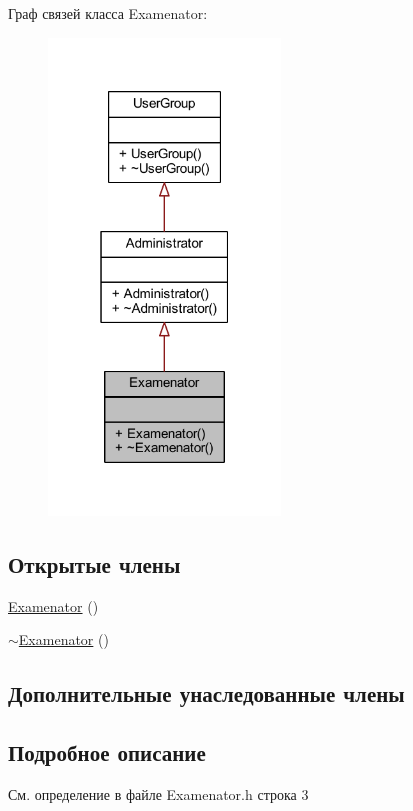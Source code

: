Граф связей класса Examenator\+:\nopagebreak
\begin{figure}[H]
\begin{center}
\leavevmode
\includegraphics[width=175pt]{dd/d27/class_examenator__coll__graph}
\end{center}
\end{figure}
\subsection*{Открытые члены}
\begin{DoxyCompactItemize}
\item 
\hyperlink{class_examenator_a35ae60e3ea40fed14b1fc2ed72566d43}{Examenator} ()
\item 
\hyperlink{class_examenator_a17573103c56d7f08f1aadf594c1a3f04}{$\sim$\+Examenator} ()
\end{DoxyCompactItemize}
\subsection*{Дополнительные унаследованные члены}


\subsection{Подробное описание}


См. определение в файле Examenator.\+h строка 3



